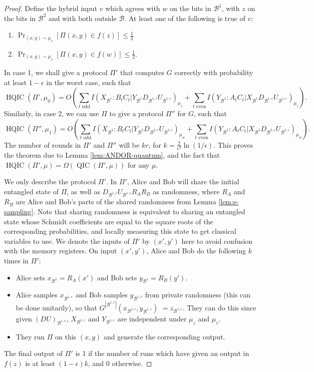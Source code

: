 \documentclass[10pt,a4paper]{article}
\theoremstyle{definition}
\renewcommand{\>}{\rangle}
\newcommand{\<}{\langle}
\newcommand{\cB}{\mathcal{B}}
\DeclareMathOperator{\QIC}{QIC}
\DeclareMathOperator{\HQIC}{HQIC}
\begin{document}
\begin{proof}
Define the hybrid input $v$ which agrees with $w$ on the bits in $\cB^1$, with $z$ on the bits in $\cB^2$ and with both outside $\cB$. At least one of the following is true of $v$:
\begin{enumerate}
    \item $\Pr_{(x,y)\sim \mu_v}[\Pi(x,y) \in f(z)] \leq \frac{1}{2}$
    \item $\Pr_{(x,y)\sim \mu_v}[\Pi(x,y) \in f(w)] \leq \frac{1}{2}$.
\end{enumerate}
In case 1, we shall give a protocol $\Pi'$ that computes $G$ correctly with probability at least $1-\epsilon$ in the worst case, such that
\[\HQIC(\Pi', \mu_0) = O\left(\sum_{t\text{ odd}}I(X_{\cB^1}:B_tC_t|Y_{\cB^1}D_{\cB^{1,c}}U_{\cB^{1,c}})_{\mu_z} + \sum_{t\text{ even}}I(Y_{\cB^1}:A_tC_t|X_{\cB^1}D_{\cB^{1,c}}U_{\cB^{1,c}})_{\mu_z}\right).\]
Similarly, in case 2, we can use $\Pi$ to give a protocol $\Pi''$ for $G$, such that
\[ \HQIC(\Pi'', \mu_1) = O\left(\sum_{t\text{ odd}}I(X_{\cB^2}:B_tC_t|Y_{\cB^2}D_{\cB^{2,c}}U_{\cB^{2,c}})_{\mu_w} + \sum_{t\text{ even}}I(Y_{\cB^2}:A_tC_t|X_{\cB^2}D_{\cB^{2,c}}U_{\cB^{2,c}})_{\mu_w}\right).\]
The number of rounds in $\Pi'$ and $\Pi''$ will be $kr$, for $k=\frac{2}{\epsilon^2}\ln(1/\epsilon)$. This proves the theorem due to Lemma \ref{lem:ANDOR-quantum}, and the fact that $\HQIC(\Pi', \mu) =\Omega( \QIC(\Pi',\mu))$ for any $\mu$.

We only describe the protocol $\Pi'$. In $\Pi'$, Alice and Bob will share the initial entangled state of $\Pi$, as well as $D_{\cB^{1,c}}U_{\cB^{1,c}}R_AR_B$ as randomness, where $R_A$ and $R_B$ are Alice and Bob's parts of the shared randomness from Lemma \ref{lem:s-sampling}. Note that sharing randomness is equivalent to sharing an entangled state whose Schmidt coefficients are equal to the square roots of the corresponding probabilities, and locally measuring this state to get classical variables to use. We denote the inputs of $\Pi'$ by $(x',y')$ here to avoid confusion with the memory registers. On input $(x',y')$, Alice and Bob do the following $k$ times in $\Pi'$:
\begin{itemize}
\item Alice sets $x_{\cB^1} = R_A(x')$ and Bob sets $y_{\cB^1} = R_B(y')$.
\item Alice samples $x_{\cB^{1,c}}$ and Bob samples $y_{\cB^{1,c}}$ from private randomness (this can be done unitarily), so that $G^{|\cB^{1,c}|}(x_{\cB^{1,c}},y_{\cB^{1,c}})$ $= z_{\cB^{1,c}}$. They can do this since given $(DU)_{\cB^{1,c}}$, $X_{\cB^{1,c}}$ and $Y_{\cB^{1,c}}$ are independent under $\mu_z$ and $\mu_v$.
\item They run $\Pi$ on this $(x,y)$ and generate the corresponding output.
\end{itemize}
The final output of $\Pi'$ is 1 if the number of runs which have given an output in $f(z)$ is at least $(1-\epsilon)k$, and 0 otherwise.


\end{proof}
\end{document}
